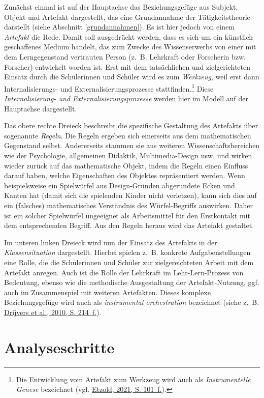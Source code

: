 \documentclass[
  ngerman,
]{scrbook}
\theoremstyle{definition}
\theoremstyle{definition}
\theoremstyle{definition}
\theoremstyle{definition}
\theoremstyle{remark}
\begin{document}
Zunächst einmal ist auf der Hauptachse das Beziehungsgefüge aus Subjekt, Objekt und Artefakt dargestellt, das eine Grundannahme der Tätigkeitstheorie darstellt (siehe Abschnitt \ref{grundannahmen}). Es ist hier jedoch von einem \emph{Artefakt} die Rede. Damit soll ausgedrückt werden, dass es sich um ein künstlich geschaffenes Medium handelt, das zum Zwecke des Wissenserwerbs von einer mit dem Lerngegenstand vertrauten Person (z.~B. Lehrkraft oder Forscherin bzw. Forscher) entwickelt worden ist. Erst mit dem tatsächlichen und zielgerichteten Einsatz durch die Schülerinnen und Schüler wird es zum \emph{Werkzeug}, weil erst dann Internalisierungs- und Externalisierungsprozesse stattfinden.\footnote{Die Entwicklung vom Artefakt zum Werkzeug wird auch als \emph{Instrumentelle Genese} bezeichnet (vgl. \protect\hyperlink{ref-Etzold2021}{Etzold, 2021, S. 101~f.}).} Diese \emph{Internalisierung- und Externalisierungsprozesse} werden hier im Modell auf der Hauptachse dargestellt.

Das obere rechte Dreieck beschreibt die spezifische Gestaltung des Artefakts über sogenannte \emph{Regeln}. Die Regeln ergeben sich einerseits aus dem mathematischen Gegenstand selbst. Andererseits stammen sie aus weiteren Wissenschaftsbereichen wie der Psychologie, allgemeinen Didaktik, Multimedia-Design usw. und wirken wieder zurück auf das mathematische Objekt, indem die Regeln einen Einfluss darauf haben, welche Eigenschaften des Objektes repräsentiert werden. Wenn beispielsweise ein Spielwürfel aus Design-Gründen abgerundete Ecken und Kanten hat (damit sich die spielenden Kinder nicht verletzen), kann sich dies auf ein (falsches) mathematisches Verständnis des Würfel-Begriffs auswirken. Daher ist ein solcher Spielwürfel ungeeignet als Arbeitsmittel für den Erstkontakt mit dem entsprechenden Begriff. Aus den Regeln heraus wird das Artefakt gestaltet.

Im unteren linken Dreieck wird nun der Einsatz des Artefakts in der \emph{Klassensituation} dargestellt. Hierbei spielen z.~B. konkrete Aufgabenstellungen eine Rolle, die die Schülerinnen und Schüler zur zielgereichteten Arbeit mit dem Artefakt anregen. Auch ist die Rolle der Lehrkraft im Lehr-Lern-Prozess von Bedeutung, ebenso wie die methodische Ausgestaltung der Artefakt-Nutzung, ggf. auch im Zusammenspiel mit weiteren Artefakten. Dieses komplexe Beziehungsgefüge wird auch als \emph{instrumental orchestration} bezeichnet (siehe z.~B. \protect\hyperlink{ref-Drijvers2010}{Drijvers et al., 2010, S. 214~f.}).

\hypertarget{analyseschritte}{%
\section{Analyseschritte}\label{analyseschritte}}
\end{document}
